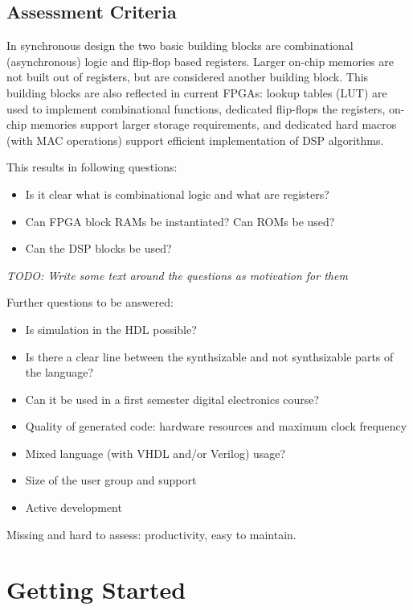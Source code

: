 \documentclass[10pt, conference, compsocconf]{IEEEtran}
\newcommand{\todo}[1]{{\emph{TODO: #1}}}
\begin{document}
\subsection{Assessment Criteria}


In synchronous design the two basic building blocks are combinational
(asynchronous) logic and flip-flop based registers. Larger on-chip
memories are not built out of registers, but are considered another building
block. This building blocks are also reflected in current FPGAs: lookup tables
(LUT) are used to implement combinational functions, dedicated flip-flops
the registers, on-chip memories support larger storage requirements,
and dedicated hard macros (with MAC operations) support efficient
implementation of DSP algorithms.

This results in following questions:
\begin{itemize}
\item Is it clear what is combinational logic and what are registers?
\item Can FPGA block RAMs be instantiated? Can ROMs be used?
\item Can the DSP blocks be used?
\end{itemize}

\todo{Write some text around the questions as motivation for them}

Further questions to be answered:

\begin{itemize}
\item Is simulation in the HDL possible?
\item Is there a clear line between the synthsizable  and not synthsizable parts of the language?
\item Can it be used in a first semester digital electronics course?
\item Quality of generated code: hardware resources and maximum clock frequency
\item Mixed language (with VHDL and/or Verilog) usage?
\item Size of the user group and support
\item Active development
\end{itemize}

Missing and hard to assess: productivity, easy to maintain.

\section{Getting Started}
\end{document}
